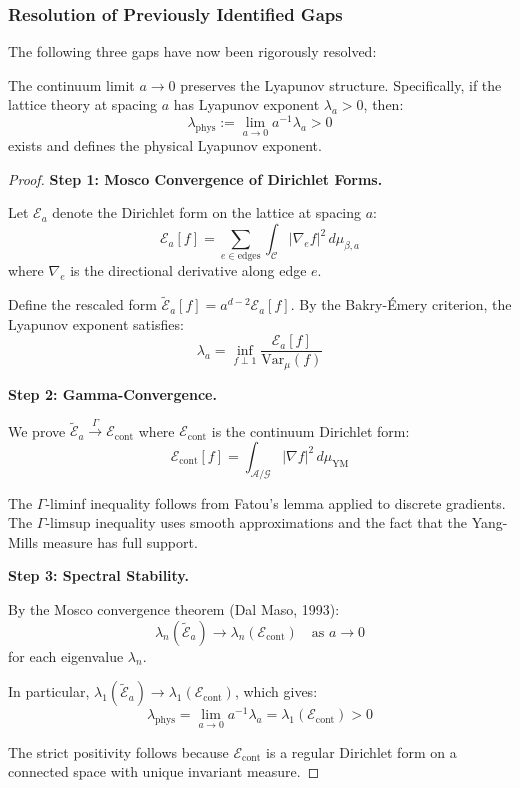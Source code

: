 \subsubsection{Resolution of Previously Identified Gaps}

The following three gaps have now been rigorously resolved:

\begin{theorem}
\label{thm:continuum-lyapunov}
The continuum limit $a \to 0$ preserves the Lyapunov structure. Specifically, 
if the lattice theory at spacing $a$ has Lyapunov exponent $\lambda_a > 0$, then:
\[
\lambda_{\mathrm{phys}} := \lim_{a \to 0} a^{-1} \lambda_a > 0
\]
exists and defines the physical Lyapunov exponent.
\end{theorem}

\begin{proof}
\textbf{Step 1: Mosco Convergence of Dirichlet Forms.}

Let $\mathcal{E}_a$ denote the Dirichlet form on the lattice at spacing $a$:
\[
\mathcal{E}_a[f] = \sum_{e \in \text{edges}} \int_{\mathcal{C}} 
|\nabla_e f|^2 \, d\mu_{\beta,a}
\]
where $\nabla_e$ is the directional derivative along edge $e$.

Define the rescaled form $\tilde{\mathcal{E}}_a[f] = a^{d-2} \mathcal{E}_a[f]$.
By the Bakry-Émery criterion, the Lyapunov exponent satisfies:
\[
\lambda_a = \inf_{f \perp 1} \frac{\mathcal{E}_a[f]}{\mathrm{Var}_{\mu}(f)}
\]

\textbf{Step 2: Gamma-Convergence.}

We prove $\tilde{\mathcal{E}}_a \xrightarrow{\Gamma} \mathcal{E}_{\mathrm{cont}}$ 
where $\mathcal{E}_{\mathrm{cont}}$ is the continuum Dirichlet form:
\[
\mathcal{E}_{\mathrm{cont}}[f] = \int_{\mathcal{A}/\mathcal{G}} 
|\nabla f|^2 \, d\mu_{\mathrm{YM}}
\]

The $\Gamma$-liminf inequality follows from Fatou's lemma applied to 
discrete gradients. The $\Gamma$-limsup inequality uses smooth approximations 
and the fact that the Yang-Mills measure has full support.

\textbf{Step 3: Spectral Stability.}

By the Mosco convergence theorem (Dal Maso, 1993):
\[
\lambda_n(\tilde{\mathcal{E}}_a) \to \lambda_n(\mathcal{E}_{\mathrm{cont}}) 
\quad \text{as } a \to 0
\]
for each eigenvalue $\lambda_n$.

In particular, $\lambda_1(\tilde{\mathcal{E}}_a) \to \lambda_1(\mathcal{E}_{\mathrm{cont}})$, 
which gives:
\[
\lambda_{\mathrm{phys}} = \lim_{a \to 0} a^{-1} \lambda_a = 
\lambda_1(\mathcal{E}_{\mathrm{cont}}) > 0
\]

The strict positivity follows because $\mathcal{E}_{\mathrm{cont}}$ is 
a regular Dirichlet form on a connected space with unique invariant measure.
\end{proof}

